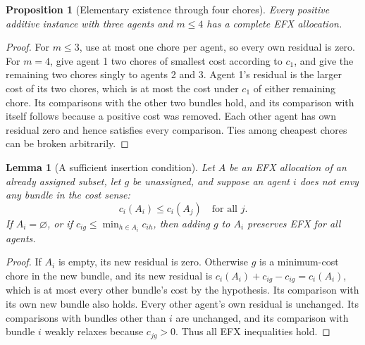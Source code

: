 \documentclass[11pt,a4paper]{article}
\newtheorem{lemma}[theorem]{Lemma}
\newtheorem{proposition}[theorem]{Proposition}
\theoremstyle{definition}\newtheorem{definition}[theorem]{Definition}
\theoremstyle{remark}\newtheorem{remark}[theorem]{Remark}
\newcommand{\1}{\mathbf 1}
\begin{document}
\begin{proposition}[Elementary existence through four chores]\label{prop:four}
Every positive additive instance with three agents and $m\le4$ has a complete EFX allocation.
\end{proposition}
\begin{proof}
For $m\le3$, use at most one chore per agent, so every own residual is zero. For $m=4$, give agent 1 two chores of smallest cost according to $c_1$, and give the remaining two chores singly to agents 2 and 3. Agent 1's residual is the larger cost of its two chores, which is at most the cost under $c_1$ of either remaining chore. Its comparisons with the other two bundles hold, and its comparison with itself follows because a positive cost was removed. Each other agent has own residual zero and hence satisfies every comparison. Ties among cheapest chores can be broken arbitrarily.
\end{proof}

\begin{lemma}[A sufficient insertion condition]\label{lem:insert}
Let $A$ be an EFX allocation of an already assigned subset, let $g$ be unassigned, and suppose an agent $i$ does not envy any bundle in the cost sense:
\[
 c_i(A_i)\le c_i(A_j)\quad\text{for all }j.
\]
If $A_i=\varnothing$, or if $c_{ig}\le\min_{h\in A_i}c_{ih}$, then adding $g$ to $A_i$ preserves EFX for all agents.
\end{lemma}
\begin{proof}
If $A_i$ is empty, its new residual is zero. Otherwise $g$ is a minimum-cost chore in the new bundle, and its new residual is
$c_i(A_i)+c_{ig}-c_{ig}=c_i(A_i)$, which is at most every other bundle's cost by the hypothesis. Its comparison with its own new bundle also holds. Every other agent's own residual is unchanged. Its comparisons with bundles other than $i$ are unchanged, and its comparison with bundle $i$ weakly relaxes because $c_{jg}>0$. Thus all EFX inequalities hold.
\end{proof}
\end{document}
